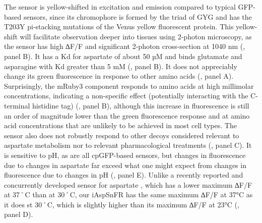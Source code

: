 \documentclass[9pt,lineno]{elife}
\begin{document}
The sensor is yellow-shifted in excitation and emission compared to typical GFP-based sensors, since its chromophore is formed by the triad of GYG and has the T203Y pi-stacking mutations of the Venus yellow fluorescent protein.
This yellow-shift will facilitate observation deeper into tissues using 2-photon microscopy, as the sensor has high ∆F/F and significant 2-photon cross-section at 1040 nm (, panel B).
It has a Kd for aspartate of about 50 µM and binds glutamate and asparagine with Kd greater than 5 mM (, panel B).
It does not appreciably change its green fluorescence in response to other amino acids (, panel A).
Surprisingly, the mRuby3 component responds to amino acids at high millimolar concentrations, indicating a non-specific effect (potentially interacting with the C-terminal histidine tag) (, panel B), although this increase in fluorescence is still an order of magnitude lower than the green fluorescence response and at amino acid concentrations that are unlikely to be achieved in most cell types.
The sensor also does not robustly respond to other decoys considered relevant to aspartate metabolism nor to relevant pharmacological treatments (, panel C).
It is sensitive to pH, as are all cpGFP-based sensors, but changes in fluorescence due to changes in aspartate far exceed what one might expect from changes in fluorescence due to changes in pH (, panel E).
Unlike a recently reported and concurrently developed sensor for aspartate \citep{Hellweg2023}, which has a lower maximum ∆F/F at 37˚C than at 30˚C, our iAspSnFR has the same maximum ∆F/F at 37°C as it does st 30˚C, which is slightly higher than its maximum ∆F/F at 23°C (, panel D).
\end{document}
